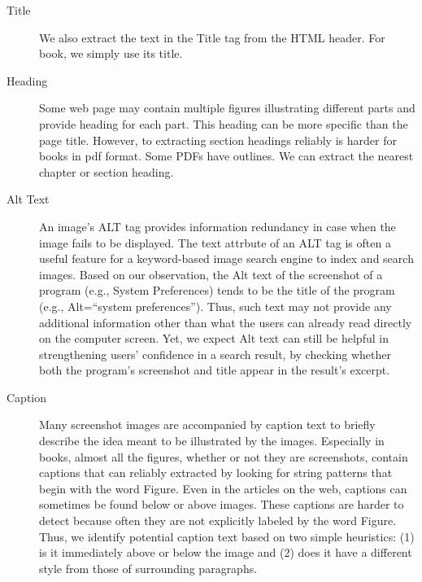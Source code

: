 \documentclass{www2010-submission}
\begin{document}
\begin{description}

\item[Title] We also extract the text in the Title tag from
the HTML header. For book, we simply use its title.

\item[Heading] Some web page may contain multiple figures
illustrating different parts and provide heading for each part.
This heading can be more specific than the page title. However, to
extracting section headings reliably is harder for books in pdf
format. Some PDFs have outlines. We can extract the nearest
chapter or section heading.

\item[Alt Text] An image's ALT tag provides information redundancy in
  case when the image fails to be displayed. The text attrbute of an
  ALT tag is often a useful feature for a keyword-based image search
  engine to index and search images. Based on our observation, the Alt
  text of the screenshot of a program (e.g., System Preferences) tends
  to be the title of the program (e.g., Alt=``system preferences'').
  Thus, such text may not provide any additional information other
  than what the users can already read directly on the computer
  screen. Yet, we expect Alt text can still be helpful in
  strengthening users' confidence in a search result, by checking
  whether both the program's screenshot and title appear in the
  result's excerpt.

\item[Caption] Many screenshot images are accompanied by caption text
  to briefly describe the idea meant to be illustrated by the images.
  Especially in books, almost all the figures, whether or not they are
  screenshots, contain captions that can reliably extracted by looking
  for string patterns that begin with the word Figure.  Even in the
  articles on the web, captions can sometimes be found below or above
  images. These captions are harder to detect because often they are
  not explicitly labeled by the word Figure. Thus, we identify
  potential caption text based on two simple heuristics: (1) is it
  immediately above or below the image and (2) does it have a
  different style from those of surrounding paragraphs.


\end{description}
\end{document}
